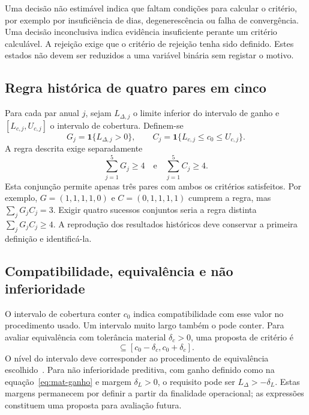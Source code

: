 Uma decisão não estimável indica que faltam condições para calcular o critério, por exemplo por insuficiência de dias, degenerescência ou falha de convergência. Uma decisão inconclusiva indica evidência insuficiente perante um critério calculável. A rejeição exige que o critério de rejeição tenha sido definido. Estes estados não devem ser reduzidos a uma variável binária sem registar o motivo.

\subsection{Regra histórica de quatro pares em cinco}
\label{sec:mat-quatro-cinco}
Para cada par anual $j$, sejam $L_{\Delta,j}$ o limite inferior do intervalo de ganho e $[L_{c,j},U_{c,j}]$ o intervalo de cobertura. Definem-se
\begin{equation}
G_j=\mathbf1\{L_{\Delta,j}>0\},
\qquad C_j=\mathbf1\{L_{c,j}\leq c_0\leq U_{c,j}\}.
\label{eq:mat-indicadores-gate}
\end{equation}
A regra descrita exige separadamente
\begin{equation}
\sum_{j=1}^{5}G_j\geq4
\quad\text{e}\quad
\sum_{j=1}^{5}C_j\geq4.
\label{eq:mat-gate-historico}
\end{equation}
Esta conjunção permite apenas três pares com ambos os critérios satisfeitos. Por exemplo, $G=(1,1,1,1,0)$ e $C=(0,1,1,1,1)$ cumprem a regra, mas $\sum_jG_jC_j=3$. Exigir quatro sucessos conjuntos seria a regra distinta $\sum_jG_jC_j\geq4$. A reprodução dos resultados históricos deve conservar a primeira definição e identificá-la.


\subsection{Compatibilidade, equivalência e não inferioridade}
\label{sec:mat-equivalencia}
O intervalo de cobertura conter $c_0$ indica compatibilidade com esse valor no procedimento usado. Um intervalo muito largo também o pode conter. Para avaliar equivalência com tolerância material $\delta_c>0$, uma proposta de critério é
\begin{equation}
[L_c,U_c]\subseteq[c_0-\delta_c,c_0+\delta_c].
\label{eq:mat-equivalencia}
\end{equation}
O nível do intervalo deve corresponder ao procedimento de equivalência escolhido~\parencite{Lakens2017}. Para não inferioridade preditiva, com ganho definido como na equação~\ref{eq:mat-ganho} e margem $\delta_L>0$, o requisito pode ser $L_\Delta>-\delta_L$. Estas margens permanecem por definir a partir da finalidade operacional; as expressões constituem uma proposta para avaliação futura.

